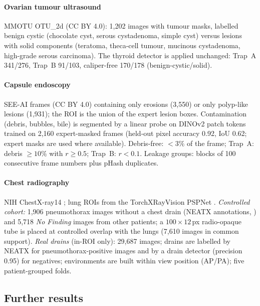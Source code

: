 \paragraph{Ovarian tumour ultrasound} MMOTU OTU\_2d \citep{zhao2022mmotu} (CC BY 4.0): 1,202 images with tumour
masks, labelled benign cystic (chocolate cyst, serous cystadenoma, simple cyst) versus lesions with solid
components (teratoma, theca-cell tumour, mucinous cystadenoma, high-grade serous carcinoma). The thyroid detector is
applied unchanged: Trap~A 341/276, Trap~B 91/103, caliper-free 170/178 (benign-cystic/solid).

\paragraph{Capsule endoscopy} SEE-AI frames \citep{seeai2023} (CC BY 4.0) containing only erosions (3,550) or only
polyp-like lesions (1,931); the ROI is the union of the expert lesion boxes. Contamination (debris, bubbles, bile)
is segmented by a linear probe on DINOv2 patch tokens trained on 2,160 expert-masked frames (held-out pixel accuracy
0.92, IoU 0.62; expert masks are used where available). Debris-free: $<3\%$ of the frame; Trap~A: debris $\ge10\%$
with $r\ge0.5$; Trap~B: $r<0.1$. Leakage groups: blocks of 100 consecutive frame numbers plus pHash duplicates.

\paragraph{Chest radiography} NIH ChestX-ray14 \citep{wang2017chestxray8}; lung ROIs from the TorchXRayVision
PSPNet \citep{cohen2022xrv}. \emph{Controlled cohort:} 1,906 pneumothorax images without a chest drain (NEATX
annotations, \citealp{cheplygina2025neatx}) and 5,718 \emph{No Finding} images from other patients; a $100\times12$\,px radio-opaque tube is
placed at controlled overlap with the lungs (7,610 images in common support). \emph{Real drains} (in-ROI only):
29,687 images; drains are labelled by NEATX \citep{cheplygina2025neatx} for pneumothorax-positive images and by a drain detector (precision
0.95) for negatives; environments are built within view position (AP/PA); five patient-grouped folds.

\subsection*{Further results}
